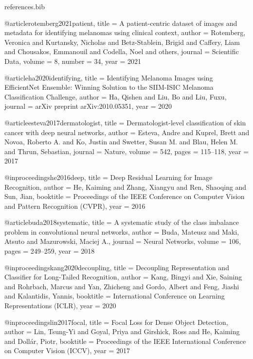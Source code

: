 \begin{filecontents*}[overwrite]{references.bib}

@article{rotemberg2021patient,
  title   = {A patient-centric dataset of images and metadata for identifying melanomas using clinical context},
  author  = {Rotemberg, Veronica and Kurtansky, Nicholas and Betz-Stablein, Brigid and Caffery, Liam and Chousakos, Emmanouil and Codella, Noel and others},
  journal = {Scientific Data},
  volume  = {8},
  number  = {34},
  year    = {2021}
}

@article{ha2020identifying,
  title   = {Identifying Melanoma Images using {EfficientNet} Ensemble: Winning Solution to the {SIIM-ISIC} Melanoma Classification Challenge},
  author  = {Ha, Qishen and Liu, Bo and Liu, Fuxu},
  journal = {arXiv preprint arXiv:2010.05351},
  year    = {2020}
}

@article{esteva2017dermatologist,
  title   = {Dermatologist-level classification of skin cancer with deep neural networks},
  author  = {Esteva, Andre and Kuprel, Brett and Novoa, Roberto A. and Ko, Justin and Swetter, Susan M. and Blau, Helen M. and Thrun, Sebastian},
  journal = {Nature},
  volume  = {542},
  pages   = {115--118},
  year    = {2017}
}

@inproceedings{he2016deep,
  title     = {Deep Residual Learning for Image Recognition},
  author    = {He, Kaiming and Zhang, Xiangyu and Ren, Shaoqing and Sun, Jian},
  booktitle = {Proceedings of the IEEE Conference on Computer Vision and Pattern Recognition (CVPR)},
  year      = {2016}
}

@article{buda2018systematic,
  title   = {A systematic study of the class imbalance problem in convolutional neural networks},
  author  = {Buda, Mateusz and Maki, Atsuto and Mazurowski, Maciej A.},
  journal = {Neural Networks},
  volume  = {106},
  pages   = {249--259},
  year    = {2018}
}

@inproceedings{kang2020decoupling,
  title     = {Decoupling Representation and Classifier for Long-Tailed Recognition},
  author    = {Kang, Bingyi and Xie, Saining and Rohrbach, Marcus and Yan, Zhicheng and Gordo, Albert and Feng, Jiashi and Kalantidis, Yannis},
  booktitle = {International Conference on Learning Representations (ICLR)},
  year      = {2020}
}

@inproceedings{lin2017focal,
  title     = {Focal Loss for Dense Object Detection},
  author    = {Lin, Tsung-Yi and Goyal, Priya and Girshick, Ross and He, Kaiming and Doll{\'a}r, Piotr},
  booktitle = {Proceedings of the IEEE International Conference on Computer Vision (ICCV)},
  year      = {2017}
}


\end{filecontents*}
